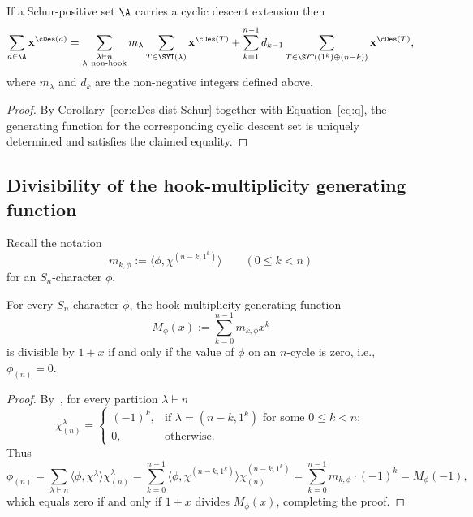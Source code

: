 \begin{corollary}
    If a Schur-positive set $\A$ carries a cyclic descent extension then 
    \[
        \sum_{a\in \A} {\bf x}^{\cDes(a)} = \sum_{\substack{\lambda\vdash n \\ \lambda\ \text{non-hook}}} m_\lambda 
        \sum_{T\in \SYT(\lambda)} {\bf x}^{\cDes(T)} + 	\sum_{k=1}^{n-1} d_{k-1}
        \sum_{T\in \SYT((1^k)\oplus (n-k))}{\bf x}^{\cDes(T)},
    \]
    where $m_\lambda$ and $d_k$ are the non-negative integers defined above.
\end{corollary}

\begin{proof}
    By Corollary~\ref{cor:cDes-dist-Schur}
	together with Equation~\eqref{eq:q}, 
	the generating function for the corresponding cyclic descent set is uniquely determined	and satisfies 
    the claimed equality.
\end{proof}
	
	
\subsection{Divisibility of the hook-multiplicity generating  function}
\label{sec:divisibility}	
	
Recall the notation 
\[
    m_{k,\phi} :=
    \langle \phi,\chi^{(n-k,1^k)} \rangle 
    \qquad (0 \le k < n)
\]
for an $S_n$-character $\phi$.

\begin{lemma}\label{lem:div}
    For every $S_n$-character $\phi$, the hook-multiplicity generating function 
    \[
    M_\phi(x) 
    := \sum\limits_{k=0}^{n-1} m_{k,\phi} x^k
    \]
    is divisible by $1+x$ if and only if 
    the value of $\phi$ on an $n$-cycle is zero, i.e.,  $\phi_{(n)}=0$. 
\end{lemma}

\begin{proof}
    By~\cite[Lemma 4.10.3]{Sagan},  
    for every partition $\lambda\vdash n$ 
    \[
        \chi^\lambda_{(n)} =
        \begin{cases} 
            (-1)^k,&\text{if } \lambda = (n-k,1^k) \text{ for some } 0 \le k < n;\\
		  0,&\text{otherwise.}
		\end{cases}
    \]
    Thus   
    \[
        \phi_{(n)}
        = \sum\limits_{\lambda\vdash n} \langle \phi,\chi^\lambda \rangle \chi^\lambda_{(n)}
        = \sum\limits_{k=0}^{n-1} \langle \phi,\chi^{(n-k,1^k)} \rangle \chi^{(n-k,1^k)}_{(n)}
        = \sum\limits_{k=0}^{n-1} m_{k,\phi} \cdot (-1)^k
        = M_\phi(-1),
    \]
    which equals zero if and only if $1+x$ divides $ M_\phi(x)$, 
    completing the proof.
\end{proof}

